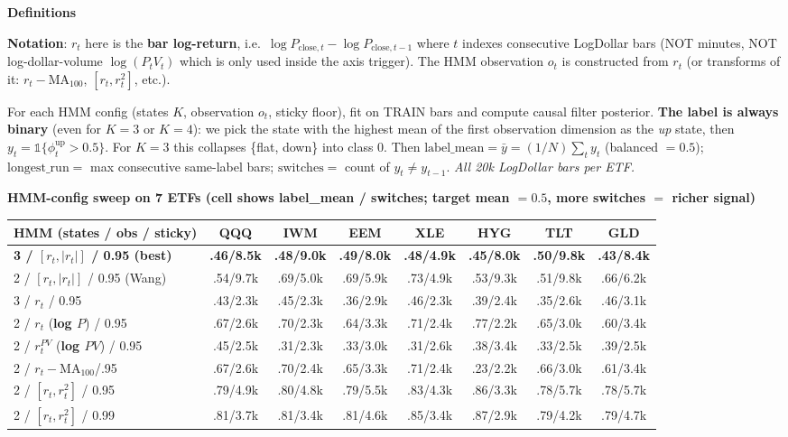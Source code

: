 \documentclass[11pt]{article}
\renewcommand{\arraystretch}{1.15}
\newcommand{\shead}[1]{\par\vspace{4pt}\noindent\textbf{\normalsize #1}\par\vspace{1pt}}
\begin{document}
\shead{Definitions}

\textbf{Notation}: $r_t$ here is the \textbf{bar log-return}, i.e.\ $\log P_{\mathrm{close},t} - \log P_{\mathrm{close},t-1}$ where $t$ indexes consecutive LogDollar bars (NOT minutes, NOT log-dollar-volume $\log(P_t V_t)$ which is only used inside the axis trigger). The HMM observation $o_t$ is constructed from $r_t$ (or transforms of it: $r_t-\mathrm{MA}_{100}$, $[r_t, r_t^2]$, etc.).

For each HMM config (states $K$, observation $o_t$, sticky floor), fit on TRAIN bars and compute causal filter posterior. \textbf{The label is always binary} (even for $K{=}3$ or $K{=}4$): we pick the state with the highest mean of the first observation dimension as the \textit{up} state, then $y_t = \mathbb{1}\{\phi_t^{\mathrm{up}} > 0.5\}$. For $K{=}3$ this collapses \{flat, down\} into class $0$. Then $\mathrm{label\_mean} = \bar y = (1/N)\sum_t y_t$ (balanced $=0.5$); $\mathrm{longest\_run} =$ max consecutive same-label bars; $\mathrm{switches} =$ count of $y_t\neq y_{t-1}$. \emph{All 20k LogDollar bars per ETF.}

\shead{HMM-config sweep on 7 ETFs (cell shows label\_mean / switches; target mean $=0.5$, more switches $=$ richer signal)}

\smallskip
\renewcommand{\arraystretch}{1.1}
\setlength{\tabcolsep}{4pt}
\begin{footnotesize}
\begin{tabular}{@{}lccccccc@{}}
\toprule
\textbf{HMM (states / obs / sticky)} & \textbf{QQQ} & \textbf{IWM} & \textbf{EEM} & \textbf{XLE} & \textbf{HYG} & \textbf{TLT} & \textbf{GLD} \\
\midrule
\textbf{3 / $[r_t,|r_t|]$ / 0.95 (best)} & \textbf{.46/8.5k} & \textbf{.48/9.0k} & \textbf{.49/8.0k} & \textbf{.48/4.9k} & \textbf{.45/8.0k} & \textbf{.50/9.8k} & \textbf{.43/8.4k} \\
2 / $[r_t,|r_t|]$ / 0.95 (Wang)    & .54/9.7k & .69/5.0k & .69/5.9k & .73/4.9k & .53/9.3k & .51/9.8k & .66/6.2k \\
3 / $r_t$ / 0.95                  & .43/2.3k & .45/2.3k & .36/2.9k & .46/2.3k & .39/2.4k & .35/2.6k & .46/3.1k \\
\midrule
2 / $r_t$ (\textbf{log $P$}) / 0.95     & .67/2.6k & .70/2.3k & .64/3.3k & .71/2.4k & .77/2.2k & .65/3.0k & .60/3.4k \\
2 / $r_t^{PV}$ (\textbf{log $PV$}) / 0.95 & .45/2.5k & .31/2.3k & .33/3.0k & .31/2.6k & .38/3.4k & .33/2.5k & .39/2.5k \\
2 / $r_t{-}\mathrm{MA}_{100}$/.95 & .67/2.6k & .70/2.4k & .65/3.3k & .71/2.4k & .23/2.2k & .66/3.0k & .61/3.4k \\
\midrule
2 / $[r_t,r_t^2]$ / 0.95          & .79/4.9k & .80/4.8k & .79/5.5k & .83/4.3k & .86/3.3k & .78/5.7k & .78/5.7k \\
2 / $[r_t,r_t^2]$ / 0.99          & .81/3.7k & .81/3.4k & .81/4.6k & .85/3.4k & .87/2.9k & .79/4.2k & .79/4.7k \\
\bottomrule
\end{tabular}
\end{footnotesize}
\setlength{\tabcolsep}{6pt}
\end{document}
